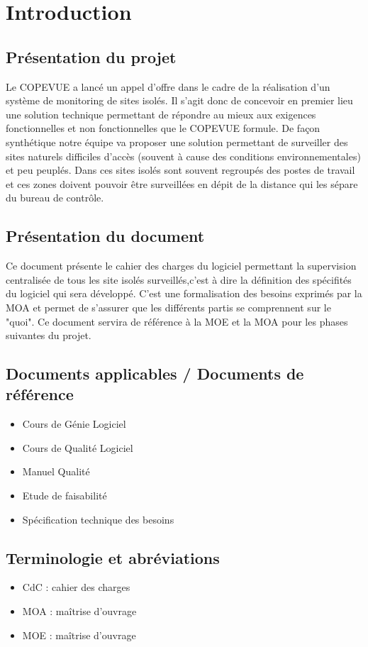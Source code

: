 \section{Introduction}
\subsection{Présentation du projet}
Le COPEVUE a lancé un appel d'offre dans le cadre de la réalisation d'un système de monitoring de sites isolés. Il s'agit donc de concevoir en premier lieu une solution technique permettant de répondre au mieux aux exigences fonctionnelles et non fonctionnelles que le COPEVUE formule. De façon synthétique notre équipe va proposer une solution permettant de surveiller des sites naturels difficiles d'accès (souvent à cause des conditions environnementales) et peu peuplés. Dans ces sites isolés sont souvent regroupés des postes de travail et ces zones doivent pouvoir être surveillées en dépit de la distance qui les sépare du bureau de contrôle.

\subsection{Présentation du document}
Ce document présente le cahier des charges du logiciel permettant la supervision centralisée de tous les site isolés surveillés,c'est à dire la définition des spécifités du logiciel qui sera développé. C'est une formalisation des besoins exprimés par la MOA et permet de s'assurer que les différents partis se comprennent sur le "quoi". Ce document servira de référence à la MOE et la MOA pour les phases suivantes du projet.

\subsection{Documents applicables / Documents de référence}
\begin{itemize}
	\item Cours de Génie Logiciel
	\item Cours de Qualité Logiciel
	\item Manuel Qualité 
	\item Etude de faisabilité
	\item Spécification technique des besoins
\end{itemize}

\subsection{Terminologie et abréviations}
\begin{itemize}
	\item CdC : cahier des charges
	\item MOA : maîtrise d'ouvrage
	\item MOE : maîtrise d'ouvrage
\end{itemize}

